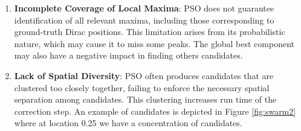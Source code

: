 \documentclass[a4paper,12pt,oneside]{report}
\theoremstyle{named}
\begin{document}
\begin{enumerate}
    \item \textbf{Incomplete Coverage of Local Maxima}: PSO does not guarantee identification of all relevant maxima, including those corresponding to ground-truth Dirac positions. This limitation arises from its probabilistic nature, which may cause it to miss some peaks. The global best component may also have a negative impact in finding others candidates.
    \item \textbf{Lack of Spatial Diversity}: PSO often produces candidates that are clustered too closely together, failing to enforce the necessary spatial separation among candidates. This clustering increases run time of the correction step. An example of candidates is depicted in Figure \ref{fig:swarm2} where at location 0.25 we have a concentration of candidates.
\end{enumerate}
\end{document}
